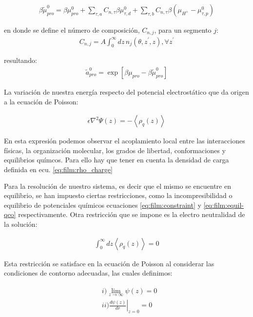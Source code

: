 \begin{align}
	\beta\tilde{\mu}^0_{pro} =  \beta \mu^0_{pro}  + \sum_{\tau,a} C_{n,\tau}\beta\mu^0_{\tau,d} 
	+ \sum_{\tau,b} C_{n,\tau}\beta(\mu_{H^+} - \mu^0_{\tau,p})
\end{align}

\noindent en donde se define el n\'umero de composici\'on, $C_{n,j}$, para un segmento $j$:
\begin{align}
	C_{n,j} = A\int_0^\infty dz \, n_j(\theta, z^\prime, z), \forall z^\prime
	\label{eq:film:n-coord}
\end{align}

 resultando:
\begin{align}
	\tilde{a}^0_{pro} = \exp[\beta\mu_{pro} - \beta\tilde{\mu}^0_{pro}]
	\label{eq:film:actividad-pro}
\end{align}

La variaci\'on de nuestra energ\'ia respecto del potencial electrost\'atico que da origen a la ecuaci\'on de Poisson:

\begin{align}
	\epsilon \nabla^2 \Psi(z) = - \left< \rho_q (z)\right>
\end{align}

En esta expresi\'on podemos observar  el acoplamiento local entre las interacciones f\'isicas, la organizaci\'on molecular, los grados de libertad, conformaciones y equilibrios qu\'imcos. Para ello hay que tener en cuenta la densidad de carga definida en ecu. \ref{eq:film:rho_charge} 

Para la resoluci\'on de nuestro sistema, es decir que el mismo  se encuentre en equilibrio, se han impuesto ciertas restricciones, como la incompresibilidad o equilibrio de potenciales qu\'imicos ecuaciones \ref{eq:film:constraint} y \ref{eq:film:equil-qco} respectivamente. Otra restricci\'on que se impone es la electro neutralidad de la soluci\'on: 

\begin{align}
	\int_0^\infty dz \left< \rho_q (z)\right> = 0
\end{align}

Esta restricci\'on se satisface en la ecuaci\'on de Poisson al considerar las condiciones de contorno adecuadas, las cuales definimos:

\begin{align}
	\begin{aligned}
		&i)  \lim_{z\to\infty}\psi(z) = 0 \\
		&ii) \left.\frac{d\psi(z)}{dr}\right|_{z=0} = 0
		\label{eq:film:contorno}
	\end{aligned}
\end{align}

